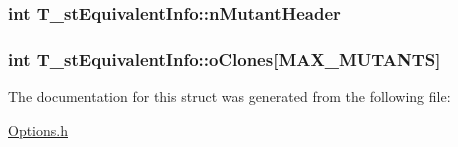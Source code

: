 \hypertarget{structT__stEquivalentInfo_a06d3ffe5f363720e93e18c063aa51f63}{
\subsubsection[{n\-Mutant\-Header}]{\setlength{\rightskip}{0pt plus 5cm}int T\-\_\-st\-Equivalent\-Info\-::n\-Mutant\-Header}}\label{structT__stEquivalentInfo_a06d3ffe5f363720e93e18c063aa51f63}
\hypertarget{structT__stEquivalentInfo_ae417176f3e5f8dc22daf5a2f7b931d78}{
\subsubsection[{o\-Clones}]{\setlength{\rightskip}{0pt plus 5cm}int T\-\_\-st\-Equivalent\-Info\-::o\-Clones\mbox{[}{\bf M\-A\-X\-\_\-\-M\-U\-T\-A\-N\-T\-S}\mbox{]}}}\label{structT__stEquivalentInfo_ae417176f3e5f8dc22daf5a2f7b931d78}


The documentation for this struct was generated from the following file\-:\begin{DoxyCompactItemize}
\item 
\hyperlink{Options_8h}{Options.\-h}\end{DoxyCompactItemize}
